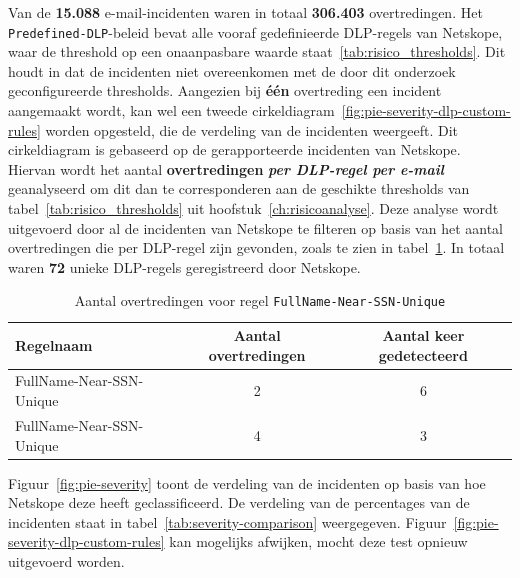 Van de \textbf{15.088} e-mail-incidenten waren in totaal \textbf{306.403} overtredingen.
Het \texttt{Predef\-ined-DLP}\--beleid bevat alle vooraf gedefinieerde DLP-regels van Netskope, waar de threshold op een onaanpasbare waarde staat~\ref{tab:risico_thresholds}.
Dit houdt in dat de incidenten niet overeenkomen met de door dit onderzoek geconfigureerde thresholds.
Aangezien bij \textbf{één} overtreding een incident aangemaakt wordt, kan wel een tweede cirkeldiagram~\ref{fig:pie-severity-dlp-custom-rules} worden opgesteld, die de verdeling van de incidenten weergeeft.
Dit cirkeldiagram is gebaseerd op de gerapporteerde incidenten van Netskope. 
Hiervan wordt het aantal \textbf{overtredingen} \textbf\textit{{per DLP-regel per e-mail}} geanalyseerd om dit dan te corresponderen aan de geschikte thresholds van tabel~\ref{tab:risico_thresholds} uit hoofstuk~\ref{ch:risicoanalyse}.
Deze analyse wordt uitgevoerd door al de incidenten van Netskope te filteren op basis van het aantal overtredingen die per DLP-regel zijn gevonden, zoals te zien in tabel~\ref{tab:fullname-near-ssn}.
In totaal waren \textbf{72} unieke DLP-regels geregistreerd door Netskope.

\begin{table}[h!]
  \centering
  \small
  \scriptsize
  \begin{tabular}{lcc}
    \toprule
    \textbf{Regelnaam} & \textbf{Aantal overtredingen} & \textbf{Aantal keer gedetecteerd} \\
    \midrule
    FullName-Near-SSN-Unique & 2 & 6 \\
    FullName-Near-SSN-Unique & 4 & 3 \\
    \bottomrule
  \end{tabular}
  \caption{Aantal overtredingen voor regel \texttt{FullName-Near-SSN-Unique}}
  \label{tab:fullname-near-ssn}
\end{table}

Figuur~\ref{fig:pie-severity} toont de verdeling van de incidenten op basis van hoe Netskope deze heeft geclassificeerd.
De verdeling van de percentages van de incidenten staat in tabel~\ref{tab:severity-comparison} weergegeven.
Figuur~\ref{fig:pie-severity-dlp-custom-rules} kan mogelijks afwijken, mocht deze test opnieuw uitgevoerd worden.



